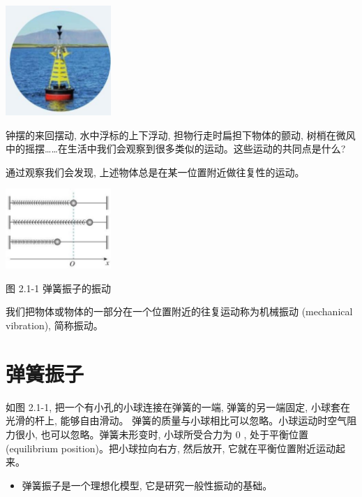 \documentclass[10pt]{article}
\begin{document}
\begin{center}
\includegraphics[max width=0.3\textwidth]{images/01910e4c-ebb8-7d2c-8f2f-2375bc1d2d12_37_921774.jpg}
\end{center}

钟摆的来回摆动, 水中浮标的上下浮动, 担物行走时扁担下物体的颤动, 树梢在微风中的摇摆……在生活中我们会观察到很多类似的运动。这些运动的共同点是什么?

通过观察我们会发现, 上述物体总是在某一位置附近做往复性的运动。

\begin{center}
\includegraphics[max width=0.3\textwidth]{images/01910e4c-ebb8-7d2c-8f2f-2375bc1d2d12_37_298397.jpg}
\end{center}

图 2.1-1 弹簧振子的振动

我们把物体或物体的一部分在一个位置附近的往复运动称为机械振动 (mechanical vibration), 简称振动。

\section*{弹簧振子}

如图 2.1-1, 把一个有小孔的小球连接在弹簧的一端, 弹簧的另一端固定, 小球套在光滑的杆上, 能够自由滑动。 弹簧的质量与小球相比可以忽略。小球运动时空气阻力很小, 也可以忽略。弹簧未形变时, 小球所受合力为 0 , 处于平衡位置 (equilibrium position)。把小球拉向右方, 然后放开, 它就在平衡位置附近运动起来。

\begin{mdframed}

\begin{itemize}
\item 弹簧振子是一个理想化模型, 它是研究一般性振动的基础。
\end{itemize}

\end{mdframed}
\end{document}
